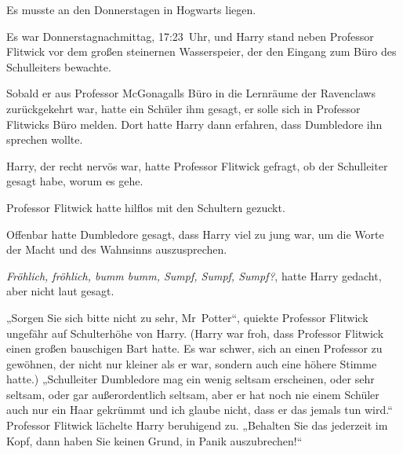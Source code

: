 Es musste an den Donnerstagen in Hogwarts liegen.

Es war Donnerstagnachmittag, 17:23~Uhr, und Harry stand neben Professor Flitwick vor dem großen steinernen Wasserspeier, der den Eingang zum Büro des Schulleiters bewachte.

Sobald er aus Professor McGonagalls Büro in die Lernräume der Ravenclaws zurückgekehrt war, hatte ein Schüler ihm gesagt, er solle sich in Professor Flitwicks Büro melden. Dort hatte Harry dann erfahren, dass Dumbledore ihn sprechen wollte.

Harry, der recht nervös war, hatte Professor Flitwick gefragt, ob der Schulleiter gesagt habe, worum es gehe.

Professor Flitwick hatte hilflos mit den Schultern gezuckt.

Offenbar hatte Dumbledore gesagt, dass Harry viel zu jung war, um die Worte der Macht und des Wahnsinns auszusprechen.

\emph{Fröhlich, fröhlich, bumm bumm, Sumpf, Sumpf, Sumpf?}, hatte Harry gedacht, aber nicht laut gesagt.

„Sorgen Sie sich bitte nicht zu sehr, Mr~Potter“, quiekte Professor Flitwick ungefähr auf Schulterhöhe von Harry. (Harry war froh, dass Professor Flitwick einen großen bauschigen Bart hatte. Es war schwer, sich an einen Professor zu gewöhnen, der nicht nur kleiner als er war, sondern auch eine höhere Stimme hatte.) „Schulleiter Dumbledore mag ein wenig seltsam erscheinen, oder sehr seltsam, oder gar außerordentlich seltsam, aber er hat noch nie einem Schüler auch nur ein Haar gekrümmt und ich glaube nicht, dass er das jemals tun wird.“ Professor Flitwick lächelte Harry beruhigend zu. „Behalten Sie das jederzeit im Kopf, dann haben Sie keinen Grund, in Panik auszubrechen!“

